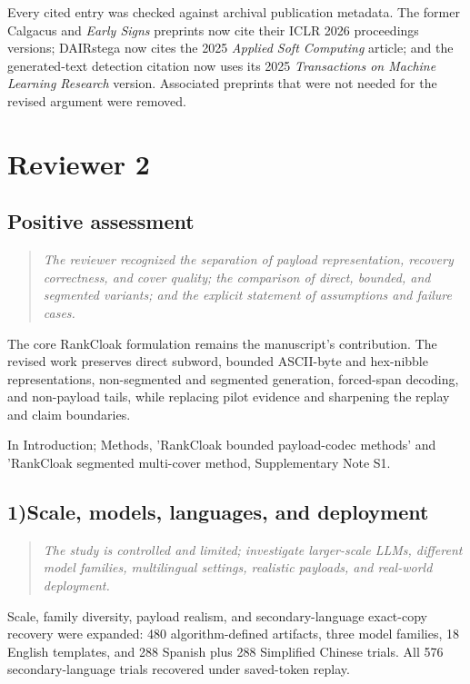 \documentclass[11pt]{article}
\newenvironment{reviewcomment}{\begin{quote}\color{commentgray}\itshape}{\end{quote}}
\begin{document}
Every cited entry was checked against archival publication metadata. The former Calgacus and \emph{Early Signs} preprints now cite their ICLR 2026 proceedings versions; DAIRstega now cites the 2025 \emph{Applied Soft Computing} article; and the generated-text detection citation now uses its 2025 \emph{Transactions on Machine Learning Research} version. Associated preprints that were not needed for the revised argument were removed.


\section*{Reviewer 2}

\subsection*{Positive assessment}
\begin{reviewcomment}
The reviewer recognized the separation of payload representation, recovery correctness, and cover quality; the comparison of direct, bounded, and segmented variants; and the explicit statement of assumptions and failure cases.
\end{reviewcomment}

The core RankCloak formulation remains the manuscript's contribution. The revised work preserves direct subword, bounded ASCII-byte and hex-nibble representations, non-segmented and segmented generation, forced-span decoding, and non-payload tails, while replacing pilot evidence and sharpening the replay and claim boundaries.

In Introduction; Methods, 'RankCloak bounded payload-codec methods' and 'RankCloak segmented multi-cover method, Supplementary Note S1.

\subsection*{1)Scale, models, languages, and deployment}
\begin{reviewcomment}
The study is controlled and limited; investigate larger-scale LLMs, different model families, multilingual settings, realistic payloads, and real-world deployment.
\end{reviewcomment}

Scale, family diversity, payload realism, and secondary-language exact-copy recovery were expanded: 480 algorithm-defined artifacts, three model families, 18 English templates, and 288 Spanish plus 288 Simplified Chinese trials. All 576 secondary-language trials recovered under saved-token replay. 
\end{document}
